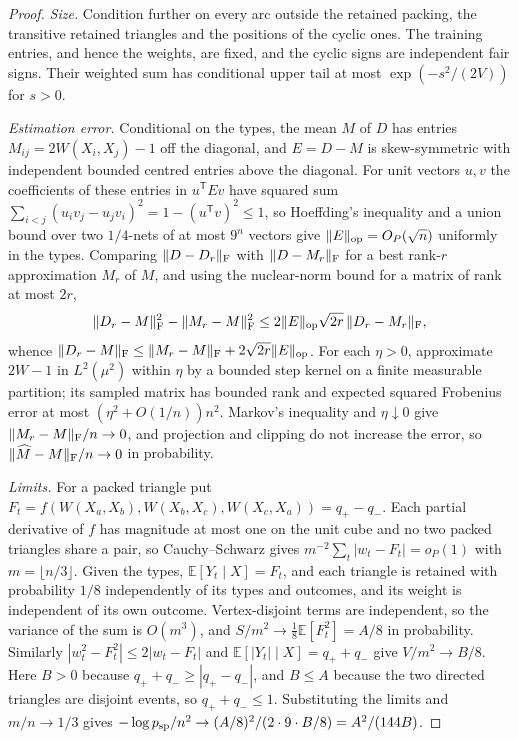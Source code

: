 \documentclass[11pt,a4paper]{article}
\theoremstyle{definition}
\newcommand{\E}{\mathbb E}
\begin{document}
\begin{proof}
\emph{Size.} Condition further on every arc outside the retained packing, the transitive retained triangles and the positions of the cyclic ones. The training entries, and hence the weights, are fixed, and the cyclic signs are independent fair signs. Their weighted sum has conditional upper tail at most $\exp(-s^2/(2V))$ for $s>0$.

\emph{Estimation error.} Conditional on the types, the mean $M$ of $D$ has entries $M_{ij}=2W(X_i,X_j)-1$ off the diagonal, and $E=D-M$ is skew-symmetric with independent bounded centred entries above the diagonal. For unit vectors $u,v$ the coefficients of these entries in $u^{\mathsf T}Ev$ have squared sum $\sum_{i<j}(u_iv_j-u_jv_i)^2=1-(u^{\mathsf T}v)^2\le1$, so Hoeffding's inequality and a union bound over two $1/4$-nets of at most $9^n$ vectors give $\|E\|_{\rm op}=O_P(\sqrt n)$ uniformly in the types. Comparing $\|D-D_r\|_{\rm F}$ with $\|D-M_r\|_{\rm F}$ for a best rank-$r$ approximation $M_r$ of $M$, and using the nuclear-norm bound for a matrix of rank at most $2r$,
\[
 \|D_r-M\|_{\rm F}^2-\|M_r-M\|_{\rm F}^2
 \le 2\|E\|_{\rm op}\sqrt{2r}\,\|D_r-M_r\|_{\rm F},
\]
whence $\|D_r-M\|_{\rm F}\le\|M_r-M\|_{\rm F}+2\sqrt{2r}\|E\|_{\rm op}$. For each $\eta>0$, approximate $2W-1$ in $L^2(\mu^2)$ within $\eta$ by a bounded step kernel on a finite measurable partition; its sampled matrix has bounded rank and expected squared Frobenius error at most $(\eta^2+O(1/n))n^2$. Markov's inequality and $\eta\downarrow0$ give $\|M_r-M\|_{\rm F}/n\to0$, and projection and clipping do not increase the error, so $\|\widehat M-M\|_{\rm F}/n\to0$ in probability.

\emph{Limits.} For a packed triangle put $F_t=f(W(X_a,X_b),W(X_b,X_c),W(X_c,X_a))=q_+-q_-$. Each partial derivative of $f$ has magnitude at most one on the unit cube and no two packed triangles share a pair, so Cauchy--Schwarz gives $m^{-2}\sum_{t}|w_t-F_t|=o_P(1)$ with $m=\lfloor n/3\rfloor$. Given the types, $\E[Y_t\mid X]=F_t$, and each triangle is retained with probability $1/8$ independently of its types and outcomes, and its weight is independent of its own outcome. Vertex-disjoint terms are independent, so the variance of the sum is $O(m^3)$, and $S/m^2\to\frac18\E[F_t^2]=A/8$ in probability. Similarly $|w_t^2-F_t^2|\le2|w_t-F_t|$ and $\E[|Y_t|\mid X]=q_++q_-$ give $V/m^2\to B/8$. Here $B>0$ because $q_++q_-\ge|q_+-q_-|$, and $B\le A$ because the two directed triangles are disjoint events, so $q_++q_-\le1$. Substituting the limits and $m/n\to1/3$ gives $-\log p_{\rm sp}/n^2\to (A/8)^2/(2\cdot 9\cdot B/8)=A^2/(144B)$.
\end{proof}
\end{document}
